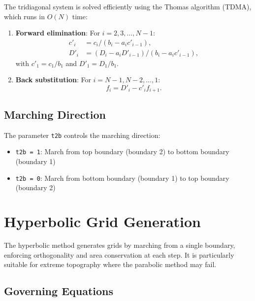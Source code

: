 \documentclass[11pt,a4paper]{report}
\begin{document}
The tridiagonal system is solved efficiently using the Thomas algorithm (TDMA), which runs in $O(N)$ time:

\begin{enumerate}
    \item \textbf{Forward elimination}: For $i = 2, 3, \ldots, N-1$:
    \begin{equation}
    \begin{aligned}
        c'_i &= c_i / (b_i - a_i c'_{i-1}), \\
        D'_i &= (D_i - a_i D'_{i-1}) / (b_i - a_i c'_{i-1}),
    \end{aligned}
    \end{equation}
    with $c'_1 = c_1/b_1$ and $D'_1 = D_1/b_1$.

    \item \textbf{Back substitution}: For $i = N-1, N-2, \ldots, 1$:
    \begin{equation}
        f_i = D'_i - c'_i f_{i+1}.
    \end{equation}
\end{enumerate}

\section{Marching Direction}

The parameter \texttt{t2b} controls the marching direction:
\begin{itemize}
    \item \texttt{t2b = 1}: March from top boundary (boundary 2) to bottom boundary (boundary 1)
    \item \texttt{t2b = 0}: March from bottom boundary (boundary 1) to top boundary (boundary 2)
\end{itemize}

\chapter{Hyperbolic Grid Generation}

The hyperbolic method generates grids by marching from a single boundary, enforcing orthogonality and area conservation at each step. It is particularly suitable for extreme topography where the parabolic method may fail.

\section{Governing Equations}
\end{document}
